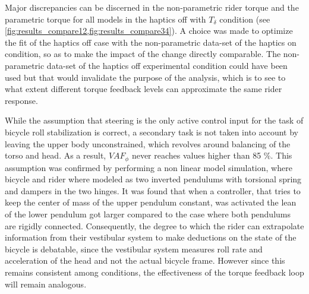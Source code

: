 Major discrepancies can be discerned in the non-parametric rider torque and the parametric torque for all models in the haptics off with \ensuremath{T_\delta} condition (see \cref{fig:results_compare12,fig:results_compare34}). A choice was made to optimize the fit of the haptics off case with the non-parametric data-set of the haptics on condition, so as to make the impact of the change directly comparable. The non-parametric data-set of the haptics off experimental condition could have been used but that would invalidate the  purpose of the analysis, which is to see to what extent different torque feedback levels can approximate the same rider response. 




While the assumption that steering is the only active control input for the task of bicycle roll stabilization is correct, a secondary task is not taken into account by leaving the upper body unconstrained, which revolves around balancing of the torso and head. As a result, \ensuremath{\mathit{VAF}_\phi} never reaches values higher than 85 \%. This assumption  was  confirmed by performing a non linear model simulation, where bicycle and rider where modeled as two inverted pendulums with torsional spring and dampers in the two hinges. It was found that when a  controller, that tries to keep the center of mass of the upper pendulum constant, was activated the lean of the lower pendulum got larger compared to the case where both pendulums are rigidly connected. Consequently, the degree to which the rider can extrapolate information from their vestibular system to make deductions on the state of the bicycle is debatable, since the vestibular system measures roll rate and acceleration of the head and not the actual bicycle frame. However since this remains consistent among conditions, the effectiveness of the torque feedback loop will remain analogous.

